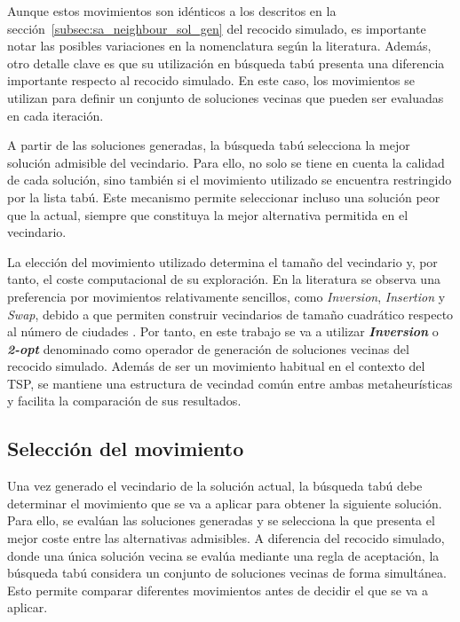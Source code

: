 Aunque estos movimientos son idénticos a los descritos en la sección~\ref{subsec:sa_neighbour_sol_gen} del recocido simulado,
es importante notar las posibles variaciones en la nomenclatura según la literatura. Además, otro detalle clave es que
su utilización en búsqueda tabú presenta una diferencia importante respecto al recocido simulado. En este caso, los movimientos
se utilizan para definir un conjunto de soluciones vecinas que pueden ser evaluadas en cada iteración.

A partir de las soluciones generadas, la búsqueda tabú selecciona la mejor solución admisible del vecindario. Para ello, no
solo se tiene en cuenta la calidad de cada solución, sino también si el movimiento utilizado se encuentra restringido por la
lista tabú. Este mecanismo permite seleccionar incluso una solución peor que la actual, siempre que constituya la mejor 
alternativa permitida en el vecindario.

La elección del movimiento utilizado determina el tamaño del vecindario y, por tanto, el coste computacional de su
exploración. En la literatura se observa una preferencia por movimientos relativamente sencillos, como \textit{Inversion},
\textit{Insertion} y \textit{Swap}, debido a que permiten construir vecindarios de tamaño cuadrático respecto al número de
ciudades \cite{basu2012}. Por tanto, en este trabajo se va a utilizar \textbf{\textit{Inversion}} o \textbf{\textit{2-opt}}
denominado como operador de generación de soluciones vecinas del recocido simulado. Además de ser un movimiento habitual en
el contexto del TSP, se mantiene una estructura de vecindad común entre ambas metaheurísticas y facilita la comparación de 
sus resultados.

\subsection{Selección del movimiento}
\label{subsec:ts_move_selec}

Una vez generado el vecindario de la solución actual, la búsqueda tabú debe determinar el movimiento que se va a aplicar
para obtener la siguiente solución. Para ello, se evalúan las soluciones generadas y se selecciona la que presenta el mejor
coste entre las alternativas admisibles. A diferencia del recocido simulado, donde una única solución vecina se evalúa 
mediante una regla de aceptación, la búsqueda tabú considera un conjunto de soluciones vecinas de forma simultánea. Esto
permite comparar diferentes movimientos antes de decidir el que se va a aplicar.

